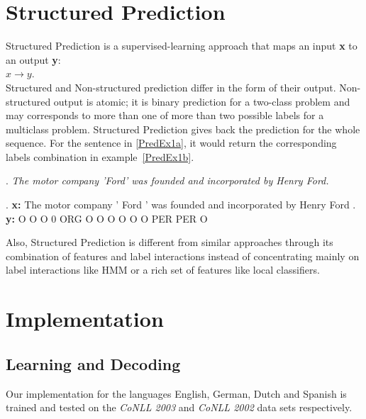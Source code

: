 \documentclass[11pt]{article}
\newcommand{\namedentity}{Named Entity}
\begin{document}
\section{Structured Prediction}
Structured Prediction \cite{strlearn} is a supervised-learning approach that maps an input \textbf{x} to an output \textbf{y}: \\

$ x \rightarrow y $. \\

Structured and  Non-structured prediction differ in the form of their output. 
Non-structured output is atomic; it is binary prediction for a two-class problem and may corresponds to more than one of more than two possible labels for a 
multiclass problem. 
Structured Prediction gives back the prediction for the whole sequence. 
For the sentence in \ref{PredEx1a}, it would return the corresponding labels combination in example~\ref{PredEx1b}. 

\begin{figure*}[ht]

\ex. \emph{The motor company 'Ford' was founded and incorporated  by Henry Ford.} \label{PredEx1a}
 
\exg. \textbf{x:} The motor company ' Ford ' was founded and incorporated by Henry Ford .\\
      \textbf{y:}  O   O      O     0 ORG  O  O     O     O       O        O PER   PER  O  \label{PredEx1b} \\
\caption{Input and predicted structure for the \namedentity task.}

\end{figure*}

Also, Structured Prediction is different from similar approaches through its combination of features and label interactions instead
of concentrating mainly on label interactions like HMM or a rich set of features like local classifiers. 

\section{Implementation}

\subsection{Learning and Decoding}

Our implementation for the languages English, German, Dutch and Spanish is trained and tested on the \emph{CoNLL 2003} and \emph{CoNLL 2002} data sets respectively. 
\end{document}

